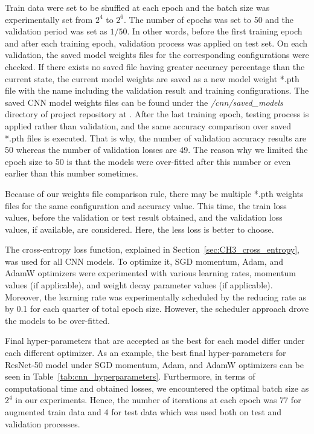 Train data were set to be shuffled at each epoch and the batch size was experimentally set from $2^4$ to $2^6$. The number of epochs was set to 50 and the validation period was set as $1/50$. In other words, before the first training epoch and after each training epoch, validation process was applied on test set. On each validation, the saved model weights files for the corresponding configurations were checked. If there exists no saved file having greater accuracy percentage than the current state, the current model weights are saved as a new model weight *.pth file with the name including the validation result and training configurations. The saved CNN model weights files can be found under the \textit{/cnn/saved\_models} directory of project repository at \textcolor{blue}{}. After the last training epoch, testing process is applied rather than validation, and the same accuracy comparison over saved *.pth files is executed. That is why, the number of validation accuracy results are 50 whereas the number of validation losses are 49. The reason why we limited the epoch size to 50 is that the models were over-fitted after this number or even earlier than this number sometimes.

Because of our weights file comparison rule, there may be multiple *.pth weights files for the same configuration and accuracy value. This time, the train loss values, before the validation or test result obtained, and the validation loss values, if available, are considered. Here, the less loss is better to choose.

The cross-entropy loss function, explained in Section~\ref{sec:CH3_cross_entropy}, was used for all CNN models. To optimize it, SGD momentum, Adam, and AdamW optimizers were experimented with various learning rates, momentum values (if applicable), and weight decay parameter values (if applicable). Moreover, the learning rate was experimentally scheduled by the reducing rate as by 0.1 for each quarter of total epoch size. However, the scheduler approach drove the models to be over-fitted. 

Final hyper-parameters that are accepted as the best for each model differ under each different optimizer. As an example, the best final hyper-parameters for ResNet-50 model under SGD momentum, Adam, and AdamW optimizers can be seen in Table~\ref{tab:cnn_hyperparameters}. Furthermore, in terms of computational time and obtained losses, we encountered the optimal batch size  as $2^4$ in our experiments. Hence, the number of iterations at each epoch was 77 for augmented train data and 4 for test data which was used both on test and validation processes.

